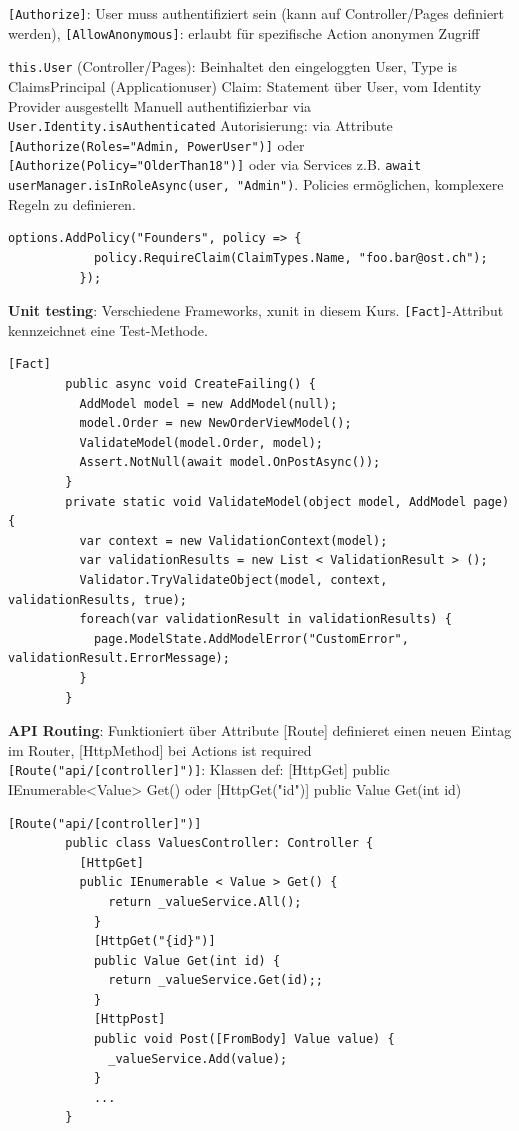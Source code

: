 \documentclass[10pt,landscape]{article}
\begin{document}
\begin{multicols}{2}
        \lstinline{[Authorize]}: User muss authentifiziert sein (kann auf Controller/Pages definiert werden), \lstinline{[AllowAnonymous]}: erlaubt für spezifische Action anonymen Zugriff

        \lstinline{this.User} (Controller/Pages): Beinhaltet den eingeloggten User, Type is ClaimsPrincipal (Applicationuser)
        Claim: Statement über User, vom Identity Provider ausgestellt
        Manuell authentifizierbar via \lstinline{User.Identity.isAuthenticated}
        Autorisierung: via Attribute \lstinline{[Authorize(Roles="Admin, PowerUser")]} oder \lstinline{[Authorize(Policy="OlderThan18")]} oder via Services z.B. \lstinline{await userManager.isInRoleAsync(user, "Admin")}.
        Policies ermöglichen, komplexere Regeln zu definieren.

        \begin{lstlisting}[style=CSharp]
          options.AddPolicy("Founders", policy => {
            policy.RequireClaim(ClaimTypes.Name, "foo.bar@ost.ch");
          });
        \end{lstlisting}

        \textbf{Unit testing}: Verschiedene Frameworks, xunit in diesem Kurs.
        \lstinline{[Fact]}-Attribut kennzeichnet eine Test-Methode.

        \begin{lstlisting}[style=CSharp]
        [Fact]
        public async void CreateFailing() {
          AddModel model = new AddModel(null);
          model.Order = new NewOrderViewModel();
          ValidateModel(model.Order, model);
          Assert.NotNull(await model.OnPostAsync());
        }
        private static void ValidateModel(object model, AddModel page) {
          var context = new ValidationContext(model);
          var validationResults = new List < ValidationResult > ();
          Validator.TryValidateObject(model, context, validationResults, true);
          foreach(var validationResult in validationResults) {
            page.ModelState.AddModelError("CustomError", validationResult.ErrorMessage);
          }
        }
        \end{lstlisting}

        \textbf{API Routing}: Funktioniert über Attribute [Route] definieret einen neuen Eintag im Router, [HttpMethod] bei Actions ist required
        \lstinline{[Route("api/[controller]")]}: Klassen def: [HttpGet] public IEnumerable<Value> Get()  oder [HttpGet("{id}")] public Value Get(int id)

        \begin{lstlisting}[style=CSharp]
        [Route("api/[controller]")]
        public class ValuesController: Controller {
          [HttpGet]
          public IEnumerable < Value > Get() {
              return _valueService.All();
            }
            [HttpGet("{id}")]
            public Value Get(int id) {
              return _valueService.Get(id);;
            }
            [HttpPost]
            public void Post([FromBody] Value value) {
              _valueService.Add(value);
            }
            ...
        }
        \end{lstlisting}


\end{multicols}
\end{document}
